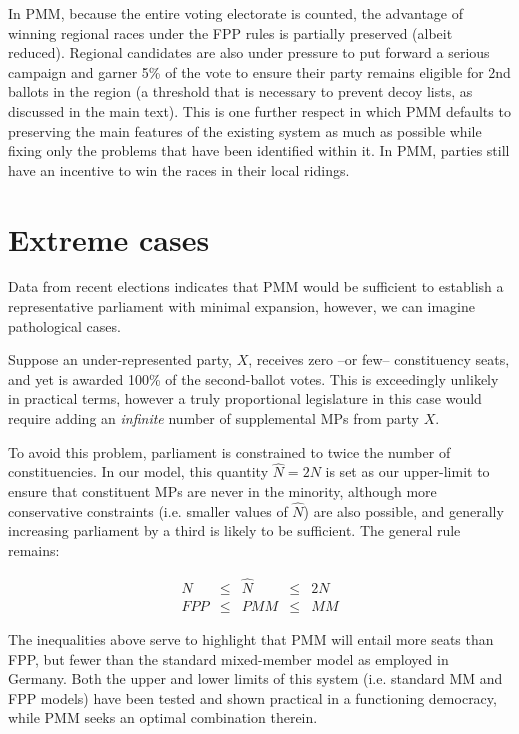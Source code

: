 \documentclass[DIV=calc, paper=a4, fontsize=11pt, twocolumn]{scrartcl}	 %
\begin{document}
In PMM, because the entire voting electorate is counted, the advantage of winning regional races under the FPP rules is partially preserved (albeit reduced). 
Regional candidates are also under pressure to put forward a serious campaign and garner 5\% of the vote to ensure their party remains eligible for 2nd ballots in the region (a threshold that is necessary to prevent decoy lists, as discussed in the main text). 
This is one further respect in which PMM defaults to preserving the main features of the existing system as much as possible while fixing only the problems that have been identified within it. 
In PMM, parties still have an incentive to win the races in their local ridings.

\section{Extreme cases}

Data from recent elections indicates that PMM would be sufficient to establish a representative parliament with minimal expansion, however, we can imagine pathological cases. 

Suppose an under-represented party, $X$, receives zero \---or few\--- constituency seats, and yet is awarded 100\% of the second-ballot votes.
This is exceedingly unlikely in practical terms, however a truly proportional legislature in this case would require adding an \emph{infinite} number of supplemental MPs from party \textbf{$X$}.

To avoid this problem, parliament is constrained to twice the number of constituencies. In our model, this quantity $\hat N = 2 N$ is set as our upper-limit to ensure that constituent MPs are never in the minority, although more conservative constraints (i.e. smaller values of $\hat N$) are also possible, and generally increasing parliament by a third is likely to be sufficient. 
The general rule remains:

\begin{align}
\label{eq:Nlimits}
N &\le& \hat{N} &\le& 2N \\
FPP &\le& PMM &\le& MM
\end{align}

The inequalities above serve to highlight that PMM will entail more seats than FPP, but fewer than the standard mixed-member model as employed in Germany. 
Both the upper and lower limits of this system (i.e. standard MM and FPP models) have been tested and shown practical in a functioning democracy, while PMM seeks an optimal combination therein.
\end{document}
